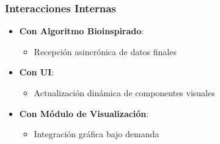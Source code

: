 \subsubsection{Interacciones Internas}
\begin{itemize}
    \item \textbf{Con Algoritmo Bioinspirado}:
    \begin{itemize}
        \item Recepción asincrónica de datos finales
    \end{itemize}
    \item \textbf{Con UI}:
    \begin{itemize}
        \item Actualización dinámica de componentes visuales
    \end{itemize}
    \item \textbf{Con Módulo de Visualización}:
    \begin{itemize}
        \item Integración gráfica bajo demanda
    \end{itemize}
\end{itemize}
\newpage
